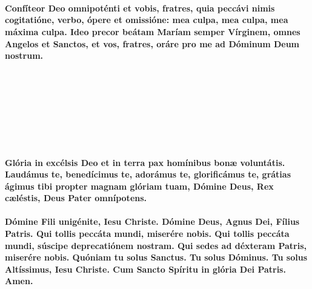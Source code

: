\documentclass[12pt, a4paper]{article}
\begin{document}
	\\
	\\
	\\
	\textbf{Confíteor Deo omnipoténti et
	vobis, fratres, quia peccávi nimis
	cogitatióne, verbo, ópere et
	omissióne: mea culpa, mea culpa,
	mea máxima culpa. Ideo precor
	beátam Maríam semper Vírginem,
	omnes Angelos et Sanctos, et vos,
	fratres, oráre pro me ad Dóminum
	Deum nostrum.}
	\\\\
	\\
	\\
	\\
	\\
	\\
	\\
	\\
	\textbf{Glória in excélsis Deo et in terra
	pax homínibus bonæ voluntátis.
	Laudámus te, benedícimus te,
	adorámus te, glorificámus te,
	grátias ágimus tibi propter magnam
	glóriam tuam, Dómine Deus, Rex
	cæléstis, Deus Pater omnípotens.}
	\\\\
	\textbf{Dómine Fili unigénite, Iesu Christe.
	Dómine Deus, Agnus Dei, Fílius
	Patris. Qui tollis peccáta mundi,
	miserére nobis. Qui tollis peccáta
	mundi, súscipe deprecatiónem
	nostram. Qui sedes ad déxteram
	Patris, miserére nobis. Quóniam tu
	solus Sanctus. Tu solus Dóminus.
	Tu solus Altíssimus, Iesu Christe.
	Cum Sancto Spíritu in glória Dei
	Patris. Amen.}
	\\\\
	\\
	
	\newpage
	
\end{document}

